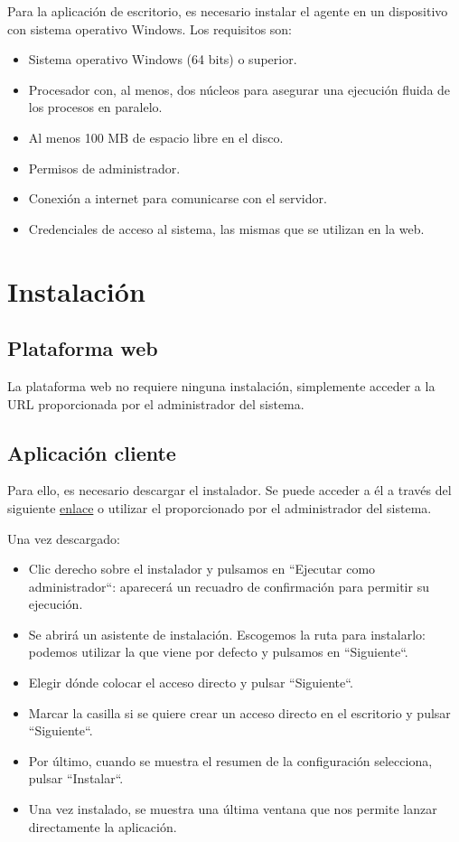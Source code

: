 Para la aplicación de escritorio, es necesario instalar el agente en un dispositivo con sistema operativo
Windows.
Los requisitos son:
\begin{itemize}
    \item Sistema operativo Windows (64 bits) o superior.
    \item Procesador con, al menos, dos núcleos para asegurar una ejecución fluida de los procesos en paralelo.
    \item Al menos 100 MB de espacio libre en el disco.
    \item Permisos de administrador.
    \item Conexión a internet para comunicarse con el servidor.
    \item Credenciales de acceso al sistema, las mismas que se utilizan en la web.
\end{itemize}

\section{Instalación}

\subsection{Plataforma web}

La plataforma web no requiere ninguna instalación, simplemente acceder a la URL proporcionada por el administrador
del sistema.

\subsection{Aplicación cliente}

Para ello, es necesario descargar el instalador.
Se puede acceder a él a través del siguiente
\href{https://github.com/rmg1008/GCA/blob/main/client/output/GCA_Installer.exe}{enlace} o utilizar el proporcionado
por el administrador del sistema.


Una vez descargado:
\begin{itemize}
    \item Clic derecho sobre el instalador y pulsamos en ``Ejecutar como administrador``: aparecerá un recuadro
    de confirmación para permitir su ejecución.
    \item Se abrirá un asistente de instalación.
    Escogemos la ruta para instalarlo: podemos utilizar la que viene por defecto y pulsamos en ``Siguiente``.
    \item Elegir dónde colocar el acceso directo y pulsar ``Siguiente``.
    \item Marcar la casilla si se quiere crear un acceso directo en el escritorio y pulsar ``Siguiente``.
    \item Por último, cuando se muestra el resumen de la configuración selecciona, pulsar ``Instalar``.
    \item Una vez instalado, se muestra una última ventana que nos permite lanzar directamente la aplicación.
\end{itemize}

